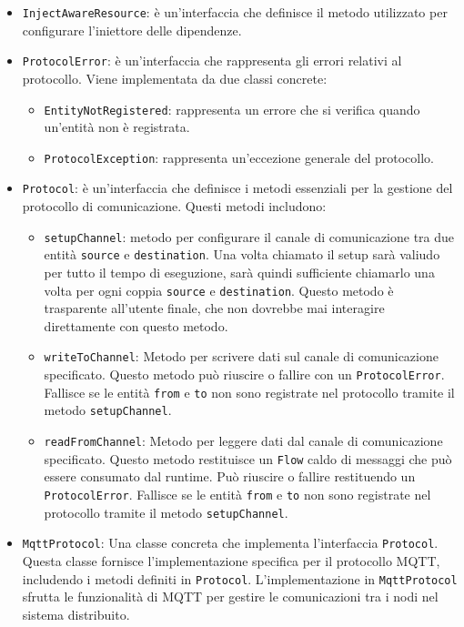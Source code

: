 \documentclass[12pt,a4paper,openright,twoside]{book}
\begin{document}
\begin{itemize}
    \item \texttt{InjectAwareResource}: è un'interfaccia che definisce il metodo utilizzato per configurare l'iniettore delle dipendenze.

    \item \texttt{ProtocolError}: è un'interfaccia che rappresenta gli errori relativi al protocollo. Viene implementata da due classi concrete:
    \begin{itemize}
        \item \texttt{EntityNotRegistered}: rappresenta un errore che si verifica quando un'entità non è registrata.
        \item \texttt{ProtocolException}: rappresenta un'eccezione generale del protocollo.
    \end{itemize}

    \item \texttt{Protocol}: è un'interfaccia che definisce i metodi essenziali per la gestione del protocollo di comunicazione. Questi metodi includono:
    \begin{itemize}
        \item \texttt{setupChannel}: metodo per configurare il canale di comunicazione tra due entità \texttt{source} e \texttt{destination}. 
        Una volta chiamato il setup sarà valiudo per tutto il tempo di eseguzione, sarà quindi sufficiente chiamarlo una volta per ogni coppia 
        \texttt{source} e \texttt{destination}. Questo metodo è trasparente all'utente finale, che non dovrebbe mai interagire direttamente con questo metodo.
        \item \texttt{writeToChannel}: Metodo per scrivere dati sul canale di comunicazione specificato. Questo metodo può riuscire 
        o fallire con un \texttt{ProtocolError}. Fallisce se le entità \texttt{from} e \texttt{to} non sono registrate nel protocollo tramite il metodo \texttt{setupChannel}.
        \item \texttt{readFromChannel}: Metodo per leggere dati dal canale di comunicazione specificato. Questo metodo restituisce un \texttt{Flow} 
        caldo di messaggi che può essere consumato dal runtime. Può riuscire o fallire restituendo un \texttt{ProtocolError}. Fallisce se le entità \texttt{from} e \texttt{to} 
        non sono registrate nel protocollo tramite il metodo \texttt{setupChannel}.
    \end{itemize}

    \item \texttt{MqttProtocol}: Una classe concreta che implementa l'interfaccia \texttt{Protocol}. Questa classe fornisce l'implementazione specifica per il protocollo MQTT, 
    includendo i metodi definiti in \texttt{Protocol}. L'implementazione in \texttt{MqttProtocol} sfrutta le funzionalità di MQTT per gestire le comunicazioni tra i nodi nel sistema 
    distribuito.

\end{itemize}
\end{document}
